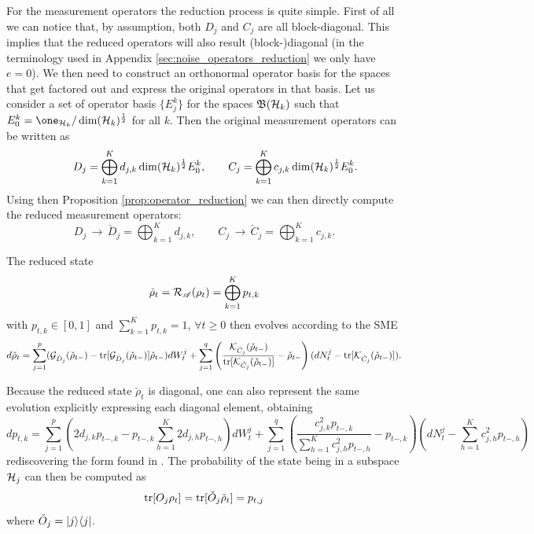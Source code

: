 \documentclass[aihp,12pt]{imsart}
\begin{document}
For the measurement operators the reduction process is quite simple. First of all we can notice that, by assumption, both $D_j$ and $C_j$ are all block-diagonal. This implies that the reduced operators will also result (block-)diagonal (in the terminology used in Appendix \ref{sec:noise_operators_reduction} we only have $e=0$). We then need to construct an orthonormal operator basis for the spaces that get factored out and express the original operators in that basis. Let us consider a set of operator basis $\{E_j^k\}$ for the spaces $\mathfrak{B}(\mathcal{H}_k)$ such that $E_0^k=\one_{\Hc_k}/\dim(\Hc_k)^\um$ for all $k$. Then the original measurement operators can be written as 
\[ \qquad D_j = \bigoplus_{k=1}^K d_{j,k}\dim(\mathcal{H}_k)^{\frac{1}{2}} E_0^k, \qquad C_j = \bigoplus_{k=1}^K c_{j,k}\dim(\mathcal{H}_k)^{\frac{1}{2}} E_0^k.\]
Using then Proposition \ref{prop:operator_reduction} we can then directly compute the reduced measurement operators:
\[D_j \,\to\, \check{D}_j = \bigoplus_{k=1}^K d_{j,k},\qquad C_j \,\to\, \check{C}_j = \bigoplus_{k=1}^K c_{j,k} .\]

The reduced state \[\check{\rho}_t = \mathcal{R}_{\mathscr{A}}(\rho_t) = \bigoplus_{k=1}^K p_{t,k}\] with $p_{t,k}\in[0,1]$ and $\sum_{k=1}^K p_{t,k} =1$, $\forall t\geq0$ then evolves according to the SME 
\[d\check{\rho}_t = \sum_{j=1}^p (\mathcal{G}_{\check{D}_j}(\check{\rho}_{t-}) - {\rm tr}[\mathcal{G}_{\check{D}_j}(\check{\rho}_{t-})]\check{\rho}_{t-}) dW_t^j + \sum_{j=1}^q\left(\frac{\mathcal{K}_{\check{C}_j}(\check{\rho}_{t-})}{{\rm tr}[\mathcal{K}_{\check{C}_j}(\check{\rho}_{t-})]}  - \check{\rho}_{t-} \right) (dN_t^j-{\rm tr}[\mathcal{K}_{\check{C}_j}(\check{\rho}_{t-})]).\]

Because the reduced state $\check{\rho}_t$ is diagonal, one can also represent the same evolution explicitly expressing each diagonal element, obtaining
\[dp_{t,k} = \sum_{j=1}^p \left(2d_{j,k}p_{t-,k}- p_{t-,k} \sum_{h=1}^K 2d_{j,h}p_{t-,h} \right)dW_t^j + \sum_{j=1}^q \left(\frac{c_{j,k}^2 p_{t-,k}}{\sum_{h=1}^K c_{j,h}^2 p_{t-,h}}-p_{t-,k}\right)\left(dN_t^j - \sum_{h=1}^K c_{j,h}^2 p_{t-,h}\right)\]
rediscovering the form found in \cite{Benoist_2014}.
The probability of the state being in a subspace $\mathcal{H}_j$ can then be computed as
\[{\rm tr}[O_j \rho_t] = {\rm tr}[\check{O}_j \check{\rho}_t] = p_{t,j}\]
where $\check{O}_j = \left\vert j \middle>\middle< j \right\vert$. 
\end{document}
